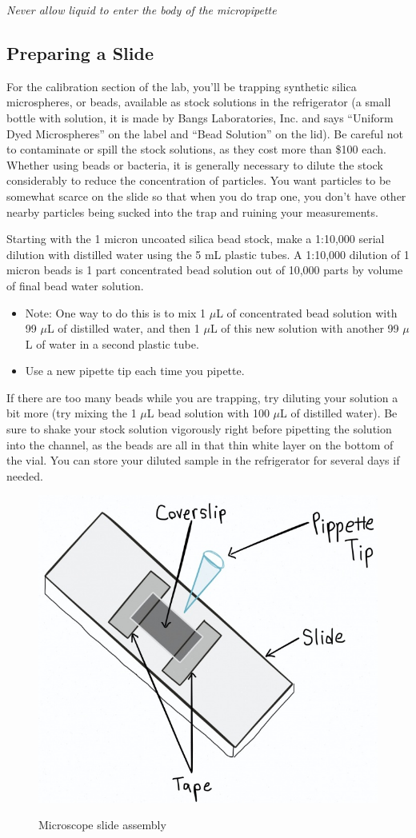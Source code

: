 \documentclass{../lab}
\begin{document}
\emph{Never allow liquid to enter the body of the micropipette}

\subsection{Preparing a Slide}

For the calibration section of the lab, you'll be trapping synthetic silica microspheres, or beads, available as stock solutions in the refrigerator (a small bottle with solution, it is made by Bangs Laboratories, Inc. and says ``Uniform Dyed Microspheres'' on the label and ``Bead Solution'' on the lid). Be careful not to contaminate or spill the stock solutions, as they cost more than \$100 each. Whether using beads or bacteria, it is generally necessary to dilute the stock considerably to reduce the concentration of particles. You want particles to be somewhat scarce on the slide so that when you do trap one, you don't have other nearby particles being sucked into the trap and ruining your measurements.

Starting with the 1 micron uncoated silica bead stock, make a 1:10,000 serial dilution with distilled water using the 5 mL plastic tubes. A 1:10,000 dilution of 1 micron beads is 1 part concentrated bead solution out of 10,000 parts by volume of final bead water solution.

\begin{itemize}
    \item Note: One way to do this is to mix 1 $\mu$L of concentrated bead solution with 99 $\mu$L of distilled water, and then 1 $\mu$L of this new solution with another 99 $\mu$L of water in a second plastic tube.

    \item Use a new pipette tip each time you pipette.
\end{itemize}

If there are too many beads while you are trapping, try diluting your solution a bit more (try mixing the 1 $\mu$L bead solution with 100 $\mu$L of distilled water). Be sure to shake your stock solution vigorously right before pipetting the solution into the channel, as the beads are all in that thin white layer on the bottom of the vial. You can store your diluted sample in the refrigerator for several days if needed.

\begin{figure}[h]
    \centering
    \href{http://experimentationlab.berkeley.edu/sites/default/files/images/OTZSlide.jpg}{\includegraphics[width=0.5\linewidth]{images/OTZSlide.jpg}}
    \caption{Microscope slide assembly}
    \label{fig:OTZSlide}
\end{figure}
\end{document}

